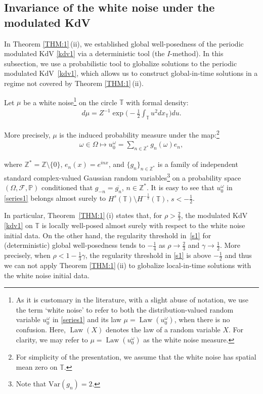 \documentclass[letterpaper, 11pt,  reqno]{amsart}
\DeclareMathOperator{\Law}{Law}
\newcommand{\1}{\hspace{0.5mm}\text{I}\hspace{0.5mm}}
\newcommand{\noi}{\noindent}
\newcommand{\Z}{\mathbb{Z}}
\newcommand{\T}{\mathbb{T}}
\newcommand{\PP}{\mathbb{P}}
\newcommand{\F}{\mathcal{F}}
\newcommand{\g}{\gamma}
\newcommand{\cj}{\overline}
\renewcommand{\o}{\omega}
\renewcommand{\O}{\Omega}
\numberwithin{equation}{section}
\numberwithin{theorem}{section}
\begin{document}
\subsection{Invariance of the white noise under the modulated KdV}
\label{SUBSEC:1.5}

In Theorem \ref{THM:1}\,(ii), 
we established global well-posedness
of the periodic modulated KdV \eqref{kdv1}
 via a deterministic tool (the $I$-method).
In this subsection, 
we use a probabilistic tool 
to globalize solutions to 
 the periodic modulated KdV~\eqref{kdv1},
 which allows us to construct global-in-time solutions
 in a regime not covered by 
Theorem \ref{THM:1}\,(ii).



Let $\mu$ be  
a  white noise\footnote{As it is customary in the literature, 
with a slight abuse of notation, 
we use the term `white noise' to refer to both the distribution-valued random variable $u_0^\o$ in \eqref{series1}
and its law $\mu = \Law (u_0^\o)$, when there is no confusion.
Here, $\Law(X)$ denotes the law of a random variable $X$.
For clarity, we may refer to $\mu = \Law (u_0^\o)$ as the white noise measure.} 
on the circle $\T$ with formal density:
\begin{align}
d\mu = Z^{-1} \exp\bigg(- \frac 12 \int_\T u^2 dx_\T\bigg) du.
\label{white1}
\end{align}

\noi
More precisely, $\mu$ is the induced probability
measure
under the map:\footnote{For simplicity of
the presentation, we assume that the white noise has spatial mean zero on $\T$.} 
\begin{align}
\o \in \O \longmapsto
u_0^\o = \sum_{n \in \Z^*} g_n(\o) e_n, 
\label{series1}
\end{align}


\noi
where $\Z^* = \Z \setminus \{0\}$, 
$e_n(x) = e^{ i n  x}$,  and 
$\{g_n \}_{n \in \Z^*}$ is a family of independent standard 
complex-valued Gaussian random variables\footnote{Note that $\text{Var}(g_n) = 2$.} 
on a probability space $(\O, \F, \PP)$
conditioned that $g_{-n} = \cj{g_n}$, $n \in \Z^*$.
It is easy to see that 
$u_0^\o$ in  \eqref{series1} belongs almost surely to $H^s(\T) \setminus H^{-\frac 12} (\T)$, $s < - \frac 12$.





In particular, 
Theorem~\ref{THM:1}\,(i)
states that, for $\rho > \frac 23$, 
the modulated KdV  \eqref{kdv1} on $\T$
is locally well-posed almost surely with respect to the white noise initial data.
On the other hand, 
the  regularity threshold 
in~\eqref{s1} for (deterministic)
global well-posedness tends to $- \frac 14$
as $\rho \to \frac 23$ and $\g \to \frac 12$.
More precisely, 
when $ \rho < 1 - \frac 13 \g$, 
the regularity threshold in \eqref{s1} is above $- \frac 12$
and thus 
we can not apply Theorem \ref{THM:1}\,(ii)
to globalize local-in-time solutions with the  white noise initial data.
\end{document}
